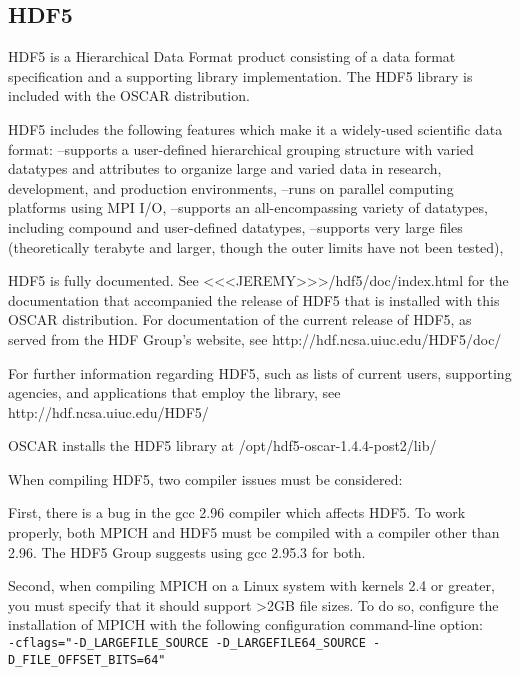 %
%
%

\subsection{HDF5}
\label{app:hdf5-overview}

HDF5 is a Hierarchical Data Format product consisting of a data format 
specification and a supporting library implementation. The HDF5 library
is included with the OSCAR distribution.


HDF5 includes the following features which make it a widely-used 
scientific data format:
   --supports a user-defined hierarchical grouping structure with 
     varied datatypes and attributes to organize large and varied data 
         in research, development, and production environments,
   --runs on parallel computing platforms using MPI I/O,
   --supports an all-encompassing variety of datatypes, including 
         compound and user-defined datatypes,
   --supports very large files (theoretically terabyte and larger, 
         though the outer limits have not been tested), 


HDF5 is fully documented.  See
   <<<JEREMY>>>/hdf5/doc/index.html
   for the documentation that accompanied the release of HDF5 that is
   installed with this OSCAR distribution. 
For documentation of the current release of HDF5, as served from the 
   HDF Group's website, see
   http://hdf.ncsa.uiuc.edu/HDF5/doc/


For further information regarding HDF5, such as lists of current users,
supporting agencies, and applications that employ the library, see
    http://hdf.ncsa.uiuc.edu/HDF5/


OSCAR installs the HDF5 library at /opt/hdf5-oscar-1.4.4-post2/lib/

When compiling HDF5, two compiler issues must be considered:

First, there is a bug in the gcc 2.96 compiler which affects HDF5. 
To work properly, both MPICH and HDF5 must be compiled with a compiler 
other than 2.96. The HDF5 Group suggests using gcc 2.95.3 for both.

Second, when compiling MPICH on a Linux system with kernels 2.4 or
greater, you must specify that it should support >2GB file sizes. To
do so, configure the installation of MPICH with the following
configuration command-line option:\\
{\small \verb+-cflags="-D_LARGEFILE_SOURCE -D_LARGEFILE64_SOURCE -D_FILE_OFFSET_BITS=64"+ }

